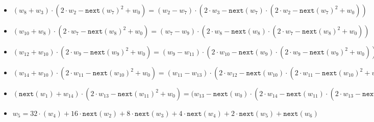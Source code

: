 \begin{itemize}
    \item $(w_{8} + w_{3}) \cdot (2 \cdot w_2 - \texttt{next}(w_7)^2 + w_{0}) = (w_2 - w_7) \cdot (2\cdot w_{3} - \texttt{next}(w_7) \cdot (2 \cdot w_2 - \texttt{next}(w_7)^2 + w_{0}))$
    \item $(w_{10} + w_{8}) \cdot (2 \cdot w_7 - \texttt{next}(w_8)^2 + w_{0}) = (w_7 - w_9) \cdot (2\cdot w_{8} - \texttt{next}(w_8) \cdot (2 \cdot w_7 - \texttt{next}(w_8)^2 + w_{0}))$
    \item $(w_{12} + w_{10}) \cdot (2 \cdot w_9 - \texttt{next}(w_9)^2 + w_{0}) = (w_9 - w_{11}) \cdot (2\cdot w_{10} - \texttt{next}(w_9) \cdot (2 \cdot w_9 - \texttt{next}(w_9)^2 + w_{0}))$
    \item $(w_{14} + w_{10}) \cdot  (2 \cdot w_{11} - \texttt{next}(w_{10})^2 + w_{0}) = (w_{11} - w_{13}) \cdot (2\cdot w_{12} - \texttt{next}(w_{10}) \cdot (2 \cdot w_{11} - \texttt{next}(w_{10})^2 + w_{0}))$
    \item $(\texttt{next}(w_{1}) + w_{14}) \cdot (2 \cdot w_{13} - \texttt{next}(w_{11})^2 + w_{0}) = (w_{13} - \texttt{next}(w_{0}) \cdot (2\cdot w_{14} - \texttt{next}(w_{11}) \cdot (2 \cdot w_{13} - \texttt{next}(w_{11})^2 + w_{0}))$ \\
    
    
    \item $w_5 = 32 \cdot (w_4) + 16 \cdot \texttt{next}(w_{2}) + 8 \cdot \texttt{next}(w_{3}) + 4 \cdot \texttt{next}(w_{4}) + 2 \cdot \texttt{next}(w_{5}) + \texttt{next}(w_{6})$
    \end{itemize}

